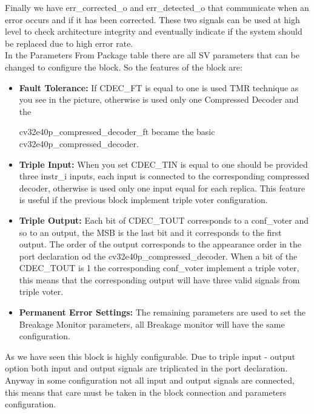 {{{        	 
        	 Finally we have err\_corrected\_o and err\_detected\_o that communicate when an error occurs and if it has been corrected.
        	 These two signals can be used at high level to check architecture integrity and eventually indicate if the system should be replaced due to high error rate.\\
        	 
        	 In the Parameters From Package table there are all SV parameters that can be changed to configure the block. So the features of the block are:
        	 \begin{itemize}
        	     \item \textbf{Fault Tolerance:} If CDEC\_FT is equal to one is used TMR technique as you see in the picture, otherwise is used only one Compressed Decoder and the
        	     
        	     
        	     \breakline cv32e40p\_compressed\_decoder\_ft became the basic cv32e40p\_compressed\_decoder.
        	     \item \textbf{Triple Input:} When you set CDEC\_TIN is equal to one should be provided three instr\_i inputs, each input is connected to the corresponding compressed decoder, otherwise is used only one input equal for each replica. This feature is useful if the previous block implement triple voter configuration. 
        	     \item \textbf{Triple Output:} Each bit of CDEC\_TOUT corresponds to a conf\_voter and so to an output, the MSB is the last bit and it corresponds to the first output. The order of the output corresponds to the appearance order in the port declaration od the cv32e40p\_compressed\_decoder. When a bit of the CDEC\_TOUT is 1 the corresponding conf\_voter implement a triple voter, this means that the corresponding output will have three valid signals from triple voter.
        	     \item \textbf{Permanent Error Settings:} The remaining parameters are used to set the Breakage Monitor parameters, all Breakage monitor will have the same configuration.
        	 \end{itemize}
        	 
        	 As we have seen this block is highly configurable. 
        	 Due to triple input - output option both input and output signals are triplicated in the port declaration.
        	 Anyway in some configuration not all input and output signals are connected, this means that care must be taken in the block connection and parameters configuration.\\
        	 
}}}
